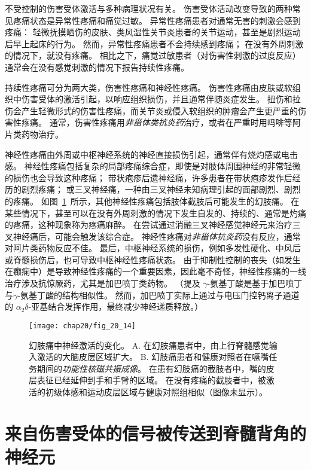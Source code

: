 不受控制的伤害受体激活与多种病理状况有关。
伤害受体活动改变导致的两种常见疼痛状态是异常性疼痛和痛觉过敏。
异常性疼痛患者对通常无害的刺激会感到疼痛：
轻微抚摸晒伤的皮肤、类风湿性关节炎患者的关节运动，甚至是剧烈运动后早上起床的行为。
然而，异常性疼痛患者不会持续感到疼痛；
在没有外周刺激的情况下，就没有疼痛。
相比之下，痛觉过敏患者（对伤害性刺激的过度反应）通常会在没有感觉刺激的情况下报告持续性疼痛。


持续性疼痛可分为两大类，伤害性疼痛和神经性疼痛。
伤害性疼痛由皮肤或软组织中伤害受体的激活引起，以响应组织损伤，并且通常伴随炎症发生。
扭伤和拉伤会产生轻微形式的伤害性疼痛，而关节炎或侵入软组织的肿瘤会产生更严重的伤害性疼痛。
通常，伤害性疼痛用\textit{非甾体类抗炎药}治疗，或者在严重时用吗啡等阿片类药物治疗。


神经性疼痛由外周或中枢神经系统的神经直接损伤引起，通常伴有烧灼感或电击感。
神经性疼痛包括复杂的局部疼痛综合症，即使是对肢体周围神经的非常轻微的损伤也会导致这种疼痛；
带状疱疹后遗神经痛，许多患者在带状疱疹发作后经历的剧烈疼痛；
或三叉神经痛，一种由三叉神经未知病理引起的面部剧烈、剧烈的疼痛。
如图~\ref{fig:20_14}~所示，其他神经性疼痛包括肢体截肢后可能发生的幻肢痛。
在某些情况下，甚至可以在没有外周刺激的情况下发生自发的、持续的、通常是灼痛的疼痛，这种现象称为疼痛麻醉。
在尝试通过消融三叉神经感觉神经元来治疗三叉神经痛后，可能会触发该综合症。
神经性疼痛对\textit{非甾体抗炎药}没有反应，通常对阿片类药物反应不佳。
最后，中枢神经系统的损伤，例如多发性硬化、中风后或脊髓损伤后，也可导致中枢神经性疼痛状态。
由于抑制性控制的丧失（如发生在癫痫中）是导致神经性疼痛的一个重要因素，因此毫不奇怪，神经性疼痛的一线治疗涉及抗惊厥药，尤其是加巴喷丁类药物。
（提及 $\gamma$-氨基丁酸是基于加巴喷丁与$\gamma$-氨基丁酸的结构相似性。
然而，加巴喷丁实际上通过与电压门控钙离子通道的 $ \alpha_2\delta $-亚基结合发挥作用，最终减少神经递质释放。）


\begin{figure}[htbp]
	\centering
	\texttt{[image: chap20/fig\_20\_14]}
	\caption{幻肢痛中神经激活的变化。
		A. 在幻肢痛患者中，由上行脊髓感觉输入激活的大脑皮层区域扩大。
		B. 幻肢痛患者和健康对照者在噘嘴任务期间的\textit{功能性核磁共振成像}。
		在患有幻肢痛的截肢者中，嘴的皮层表征已经延伸到手和手臂的区域。
		在没有疼痛的截肢者中，被激活的初级体感和运动皮层区域与健康对照组相似（图像未显示）\cite{flor2006phantom}。}
	\label{fig:20_14}
\end{figure}



\section{来自伤害受体的信号被传送到脊髓背角的神经元}

